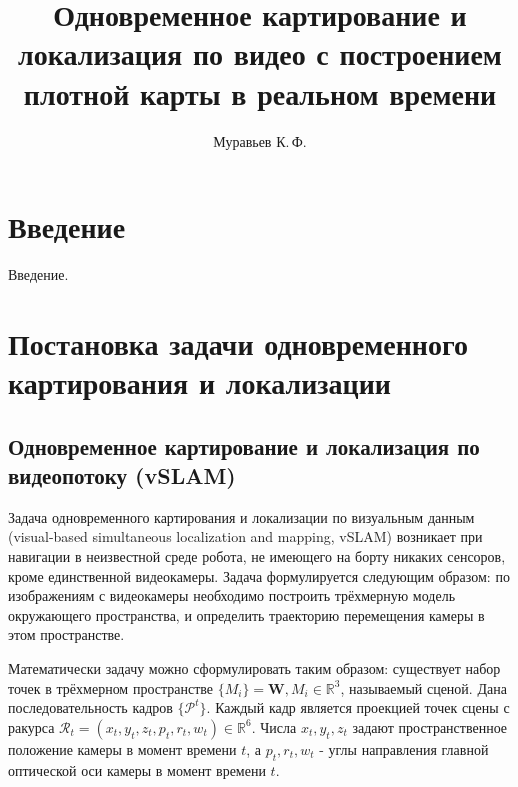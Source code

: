 \documentclass{mipt-thesis-ms}
\title{Одновременное картирование и локализация по видео с построением плотной карты в реальном времени}
\author{Муравьев К.\,Ф.}
\begin{document}
	
	
	\chapter{Введение}
	
	Введение.
	
	
	\chapter{Постановка задачи одновременного картирования и локализации}
	
	\section{Одновременное картирование и локализация по видеопотоку (vSLAM)}
	
	Задача одновременного картирования и локализации по визуальным данным (visual-based simultaneous localization and mapping, vSLAM) возникает при навигации в неизвестной среде робота, не имеющего на борту никаких сенсоров, кроме единственной видеокамеры. Задача формулируется следующим образом: по изображениям с видеокамеры необходимо построить трёхмерную модель окружающего пространства, и определить траекторию перемещения камеры в этом пространстве.
	
	Математически задачу можно сформулировать таким образом: существует набор точек в трёхмерном пространстве $\{M_i \} = \textbf{W}, M_i \in \mathbb{R}^3$, называемый сценой. Дана последовательность кадров $\{\mathcal{P}^t\}$. Каждый кадр является проекцией точек сцены с ракурса $\mathcal{R}_t = (x_t, y_t, z_t, p_t, r_t, w_t) \in \mathbb{R}^6$. Числа $x_t, y_t, z_t$ задают пространственное положение камеры в момент времени $t$, а $p_t, r_t, w_t$ - углы направления главной оптической оси камеры в момент времени $t$.
	
\end{document}
